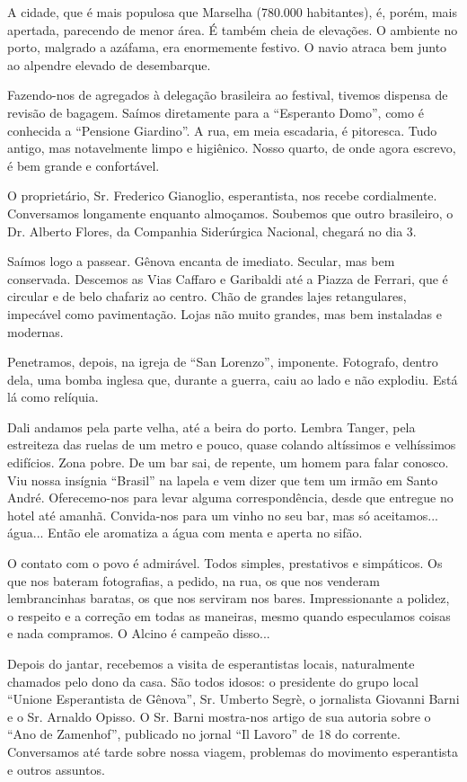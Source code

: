 A cidade, que é mais populosa que Marselha (780.000 habitantes), é, porém, mais apertada, parecendo de menor área. É também cheia de elevações. O ambiente no porto, malgrado a azáfama, era enormemente festivo. O navio atraca bem junto ao alpendre elevado de desembarque.

Fazendo-nos de agregados à delegação brasileira ao festival, tivemos dispensa de revisão de bagagem. Saímos diretamente para a ``Esperanto Domo'', como é conhecida a ``Pensione Giardino''. A rua, em meia escadaria, é pitoresca. Tudo antigo, mas notavelmente limpo e higiênico. Nosso quarto, de onde agora escrevo, é bem grande e confortável.

O proprietário, Sr. Frederico Gianoglio, esperantista, nos recebe cordialmente. Conversamos longamente enquanto almoçamos. Soubemos que outro brasileiro, o Dr. Alberto Flores, da Companhia Siderúrgica Nacional, chegará no dia 3.

Saímos logo a passear. Gênova encanta de imediato. Secular, mas bem conservada. Descemos as Vias Caffaro e Garibaldi até a Piazza de Ferrari, que é circular e de belo chafariz ao centro. Chão de grandes lajes retangulares, impecável como pavimentação. Lojas não muito grandes, mas bem instaladas e modernas.

Penetramos, depois, na igreja de ``San Lorenzo'', imponente. Fotografo, dentro dela, uma bomba inglesa que, durante a guerra, caiu ao lado e não explodiu. Está lá como relíquia.

Dali andamos pela parte velha, até a beira do porto. Lembra Tanger, pela estreiteza das ruelas de um metro e pouco, quase colando altíssimos e velhíssimos edifícios. Zona pobre. De um bar sai, de repente, um homem para falar conosco. Viu nossa insígnia ``Brasil'' na lapela e vem dizer que tem um irmão em Santo André. Oferecemo-nos para levar alguma correspondência, desde que entregue no hotel até amanhã. Convida-nos para um vinho no seu bar, mas só aceitamos... água... Então ele aromatiza a água com menta e aperta no sifão.

O contato com o povo é admirável. Todos simples, prestativos e simpáticos. Os que nos bateram fotografias, a pedido, na rua, os que nos venderam lembrancinhas baratas, os que nos serviram nos bares. Impressionante a polidez, o respeito e a correção em todas as maneiras, mesmo quando especulamos coisas e nada compramos. O Alcino é campeão disso...

Depois do jantar, recebemos a visita de esperantistas locais, naturalmente chamados pelo dono da casa. São todos idosos: o presidente do grupo local ``Unione Esperantista de Gênova'', Sr. Umberto Segrè, o jornalista Giovanni Barni e o Sr. Arnaldo Opisso. O Sr. Barni mostra-nos artigo de sua autoria sobre o ``Ano de Zamenhof'', publicado no jornal ``Il Lavoro'' de 18 do corrente. Conversamos até tarde sobre nossa viagem, problemas do movimento esperantista e outros assuntos.

